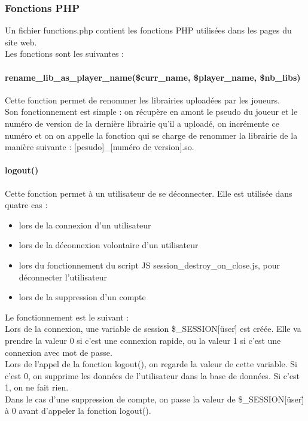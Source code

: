 \documentclass[12pt, openany]{article}
\begin{document}
	\subsubsection{Fonctions PHP}
	Un fichier functions.php contient les fonctions PHP utilisées dans les pages du site web.\\
	Les fonctions sont les suivantes :\\

	\paragraph{rename\_lib\_as\_player\_name(\$curr\_name, \$player\_name, \$nb\_libs)}
	Cette fonction permet de renommer les librairies uploadées par les joueurs.\\
	Son fonctionnement est simple : on récupère en amont le pseudo du joueur et le numéro de version de la dernière librairie qu'il a uploadé, on incrémente ce numéro et on on appelle la fonction qui se charge de renommer la librairie de la manière suivante : [pesudo]\_[numéro de version].so.\\


	\paragraph{logout()}
	Cette fonction permet à un utilisateur de se déconnecter. Elle est utilisée dans quatre cas :
	\begin{itemize}[label=$-$]
		\item lors de la connexion d'un utilisateur\\
		\item lors de la déconnexion volontaire d'un utilisateur\\
		\item lors du fonctionnement du script JS session\_destroy\_on\_close.js, pour déconnecter l'utilisateur\\
		\item lors de la suppression d'un compte\\
	\end{itemize}
	Le fonctionnement est le suivant :\\
	Lors de la connexion, une variable de session \$\_SESSION[\"user\"] est créée. Elle va prendre la valeur 0 si c'est une connexion rapide, ou la valeur 1 si c'est une connexion avec mot de passe.\\
	Lors de l'appel de la fonction logout(), on regarde la valeur de cette variable. Si c'est 0, on supprime les données de l'utilisateur dans la base de données. Si c'est 1, on ne fait rien.\\
	Dans le cas d'une suppression de compte, on passe la valeur de \$\_SESSION[\"user\"] à 0 avant d'appeler la fonction logout().\\
\end{document}
